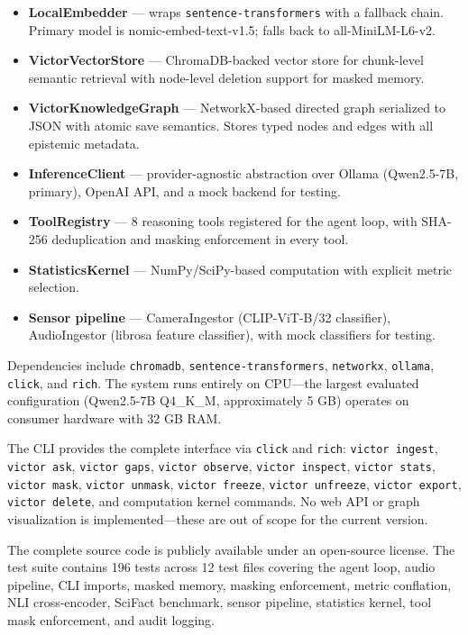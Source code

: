 \documentclass[letterpaper]{article}          %
\theoremstyle{plain}
\theoremstyle{definition}
\theoremstyle{remark}
\begin{document}
\begin{itemize}
    \item \textbf{LocalEmbedder} --- wraps \texttt{sentence-transformers} with a
    fallback chain. Primary model is nomic-embed-text-v1.5; falls back to
    all-MiniLM-L6-v2.
    \item \textbf{VictorVectorStore} --- ChromaDB-backed vector store for
    chunk-level semantic retrieval with node-level deletion support for masked
    memory.
    \item \textbf{VictorKnowledgeGraph} --- NetworkX-based directed graph
    serialized to JSON with atomic save semantics. Stores typed nodes and edges
    with all epistemic metadata.
    \item \textbf{InferenceClient} --- provider-agnostic abstraction over Ollama
    (Qwen2.5-7B, primary), OpenAI API, and a mock backend for testing.
    \item \textbf{ToolRegistry} --- 8 reasoning tools registered for the agent
    loop, with SHA-256 deduplication and masking enforcement in every tool.
    \item \textbf{StatisticsKernel} --- NumPy/SciPy-based computation with
    explicit metric selection.
    \item \textbf{Sensor pipeline} --- CameraIngestor (CLIP-ViT-B/32 classifier),
    AudioIngestor (librosa feature classifier), with mock classifiers for testing.
\end{itemize}

Dependencies include \texttt{chromadb}, \texttt{sentence-transformers},
\texttt{networkx}, \texttt{ollama}, \texttt{click}, and \texttt{rich}. The system
runs entirely on CPU---the largest evaluated configuration (Qwen2.5-7B Q4\_K\_M,
approximately 5 GB) operates on consumer hardware with 32 GB RAM.

The CLI provides the complete interface via \texttt{click} and \texttt{rich}:
\texttt{victor ingest}, \texttt{victor ask}, \texttt{victor gaps},
\texttt{victor observe}, \texttt{victor inspect}, \texttt{victor stats},
\texttt{victor mask}, \texttt{victor unmask}, \texttt{victor freeze},
\texttt{victor unfreeze}, \texttt{victor export}, \texttt{victor delete},
and computation kernel commands. No web API or graph visualization is
implemented---these are out of scope for the current version.

The complete source code is publicly available under an open-source license. The test suite contains 196 tests across 12 test files covering the agent loop,
audio pipeline, CLI imports, masked memory, masking enforcement, metric
conflation, NLI cross-encoder, SciFact benchmark, sensor pipeline, statistics
kernel, tool mask enforcement, and audit logging.
\end{document}
